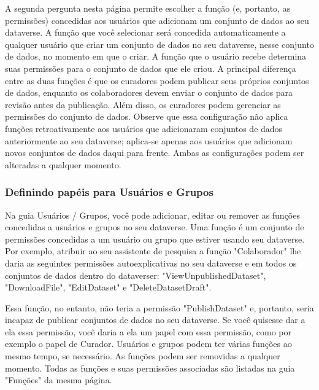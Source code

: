 \documentclass[12pt,hidelinks]{article}
\begin{document}
A segunda pergunta nesta página permite escolher a função (e, portanto, as permissões) concedidas aos usuários que adicionam um conjunto de dados ao seu dataverse. A função que você selecionar será concedida automaticamente a qualquer usuário que criar um conjunto de dados no seu dataverse, nesse conjunto de dados, no momento em que o criar. A função que o usuário recebe determina suas permissões para o conjunto de dados que ele criou. A principal diferença entre as duas funções é que os curadores podem publicar seus próprios conjuntos de dados, enquanto os colaboradores devem enviar o conjunto de dados para revisão antes da publicação. Além disso, os curadores podem gerenciar as permissões do conjunto de dados. Observe que essa configuração não aplica funções retroativamente aos usuários que adicionaram conjuntos de dados anteriormente ao seu dataverse; aplica-se apenas aos usuários que adicionam novos conjuntos de dados daqui para frente. Ambas as configurações podem ser alteradas a qualquer momento.
        
        \subsubsection{Definindo papéis para Usuários e Grupos}
        
\qquad Na guia Usuários / Grupos, você pode adicionar, editar ou remover as funções concedidas a usuários e grupos no seu dataverse. Uma função é um conjunto de permissões concedidas a um usuário ou grupo que estiver usando seu dataverse. Por exemplo, atribuir ao seu assistente de pesquisa a função "Colaborador" lhe daria as seguintes permissões autoexplicativas no seu dataverse e em todos os conjuntos de dados dentro do dataverser: "ViewUnpublishedDataset", "DownloadFile", "EditDataset" e "DeleteDatasetDraft". 

Essa função, no entanto, não teria a permissão "PublishDataset" e, portanto, seria incapaz de publicar conjuntos de dados no seu dataverse. Se você quisesse dar a ela essa permissão, você daria a ela um papel com essa permissão, como por exemplo o papel de Curador. Usuários e grupos podem ter várias funções ao mesmo tempo, se necessário. As funções podem ser removidas a qualquer momento. Todas as funções e suas permissões associadas são listadas na guia "Funções" da mesma página.
        
\end{document}
